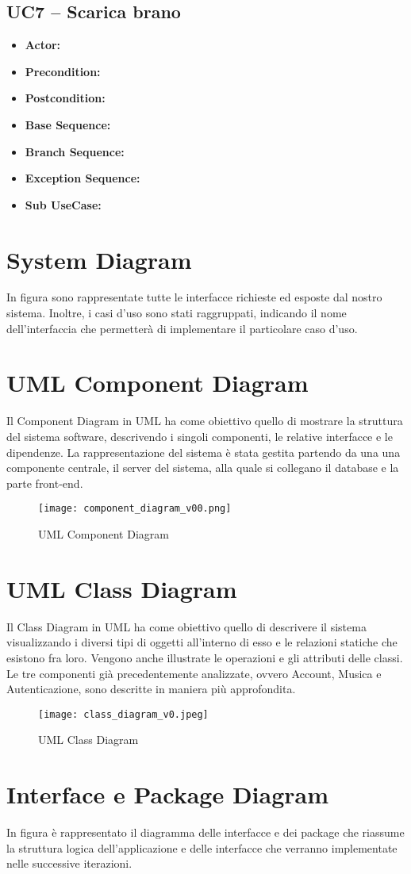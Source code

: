 \subsection{\textbf{UC7 -- Scarica brano}}
\begin{itemize}
    \item \textbf{Actor:}
    \item \textbf{Precondition:}
    \item \textbf{Postcondition:}
    \item \textbf{Base Sequence:}
    \item \textbf{Branch Sequence:}
    \item \textbf{Exception Sequence:}
    \item \textbf{Sub UseCase:}

\end{itemize}






\newpage
\section{System Diagram}
In figura sono rappresentate tutte le interfacce richieste ed esposte dal nostro sistema. Inoltre,
i casi d'uso sono stati raggruppati, indicando il nome dell'interfaccia che permetterà di implementare
il particolare caso d'uso.


\newpage
\section{UML Component Diagram}
Il Component Diagram in UML ha come obiettivo quello di mostrare la struttura
del sistema software, descrivendo i singoli componenti, le relative interfacce 
e le dipendenze. 
La rappresentazione del sistema è stata gestita partendo da una
una componente centrale, il server del sistema, alla quale si collegano il database e la parte front-end.


\begin{figure}[H]
    \centering
    \texttt{[image: component\_diagram\_v00.png]}
    \caption{UML Component Diagram}
    \label{fig-uml-component-diag}
\end{figure}



\newpage
\section{UML Class Diagram}
Il Class Diagram in UML ha come obiettivo quello di descrivere il sistema 
visualizzando i diversi tipi di oggetti all'interno di esso e le relazioni 
statiche che esistono fra loro. Vengono anche illustrate le operazioni e 
gli attributi delle classi. 
Le tre componenti già precedentemente analizzate, ovvero Account, Musica e 
Autenticazione, sono descritte in maniera più approfondita.
\begin{figure}[H]
    \centering
    \texttt{[image: class\_diagram\_v0.jpeg]}
    \caption{UML Class Diagram}
    \label{fig-uml-class-diag}
\end{figure}


\newpage
\section{Interface e Package Diagram}
In figura è rappresentato il diagramma delle interfacce e dei package che riassume la struttura
logica dell'applicazione e delle interfacce che verranno implementate nelle successive iterazioni.